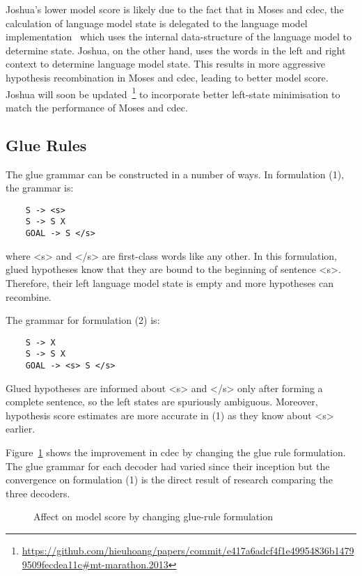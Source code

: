 \documentclass{pbml}
\begin{document}
Joshua's lower model score is likely due to the fact that in Moses and cdec, the calculation of language model state is delegated to the language model implementation~\cite{Heafield-left} which uses the internal data-structure of the language model to determine state. Joshua, on the other hand, uses the words in the left and right context to determine language model state. This results in more aggressive hypothesis recombination in Moses and cdec, leading to better model score. Joshua will soon be updated~\footnote{\url{https://github.com/hieuhoang/papers/commit/e417a6adcf4f1e49954836b14799509fecdea11c#mt-marathon.2013} } to incorporate better left-state minimisation to match the performance of Moses and cdec. 

\subsection{Glue Rules}

The glue grammar can be constructed in a number of ways. In formulation (1), the grammar is:
 \begin{verbatim}
    S -> <s>
    S -> S X
    GOAL -> S </s> 
 \end{verbatim}
 where <s> and </s> are first-class words like any other. In this formulation, glued hypotheses know that they are bound to the beginning of sentence <s>.  Therefore, their left language model state is empty and more hypotheses can recombine.  
 
The grammar for formulation (2) is:
 \begin{verbatim}
    S -> X
    S -> S X
    GOAL -> <s> S </s> 
 \end{verbatim}
Glued hypotheses are informed about <s> and </s> only after forming a complete sentence, so the left states are spuriously ambiguous.  Moreover, hypothesis score estimates are more accurate in (1) as they know about <s> earlier. 

Figure~\ref{fig:glue} shows the improvement in cdec by changing the glue rule formulation. The glue grammar for each decoder had varied since their inception but the convergence on formulation (1) is the direct result of research comparing the three decoders.

 \begin{figure}[h]
 \begin{center}
 
 \end{center}
 \caption{Affect on model score by changing glue-rule formulation}
 \label{fig:glue}
 \end{figure}
\end{document}
